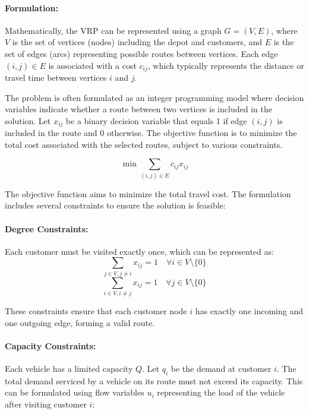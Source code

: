 \documentclass[
]{article}
\begin{document}
    \paragraph{Formulation:}
    Mathematically, the VRP can be represented using a graph \( G = (V, E) \), where \( V \) is the set of vertices (nodes) including the depot and customers, and \( E \) is the set of edges (arcs) representing possible routes between vertices. Each edge \( (i, j) \in E \) is associated with a cost \( c_{ij} \), which typically represents the distance or travel time between vertices \( i \) and \( j \).

    The problem is often formulated as an integer programming model where decision variables indicate whether a route between two vertices is included in the solution. Let \( x_{ij} \) be a binary decision variable that equals 1 if edge \( (i, j) \) is included in the route and 0 otherwise. The objective function is to minimize the total cost associated with the selected routes, subject to various constraints.

    \begin{equation}
        \min \sum_{(i,j) \in E} c_{ij} x_{ij}
    \end{equation}

    The objective function aims to minimize the total travel cost. The formulation includes several constraints to ensure the solution is feasible:

    \paragraph{Degree Constraints:}
    Each customer must be visited exactly once, which can be represented as:
    \begin{equation}
        \sum_{j \in V, j \neq i} x_{ij} = 1 \quad \forall i \in V \setminus \{0\}
    \end{equation}
    \begin{equation}
        \sum_{i \in V, i \neq j} x_{ij} = 1 \quad \forall j \in V \setminus \{0\}
    \end{equation}

    These constraints ensure that each customer node \( i \) has exactly one incoming and one outgoing edge, forming a valid route.

    \paragraph{Capacity Constraints:}
    Each vehicle has a limited capacity \( Q \). Let \( q_i \) be the demand at customer \( i \). The total demand serviced by a vehicle on its route must not exceed its capacity. This can be formulated using flow variables \( u_i \) representing the load of the vehicle after visiting customer \( i \):
\end{document}
